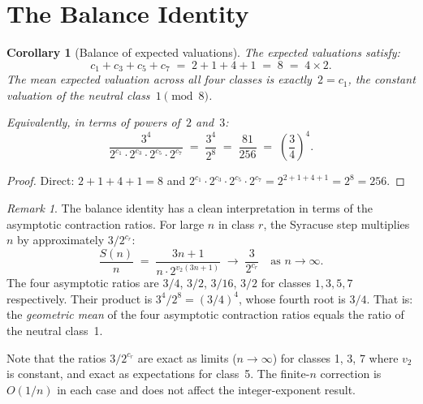 \documentclass[12pt]{article}
\newtheorem{corollary}[theorem]{Corollary}
\theoremstyle{definition}
\theoremstyle{remark}
\newtheorem{remark}[theorem]{Remark}
\newcommand{\vt}{v_2}
\newcommand{\Sm}{S}
\begin{document}
\section{The Balance Identity}
\label{sec:balance}

\begin{corollary}[Balance of expected valuations]
\label{cor:balance}
The expected valuations satisfy:
\[
  c_1 + c_3 + c_5 + c_7 \;=\; 2 + 1 + 4 + 1 \;=\; 8 \;=\; 4 \times 2.
\]
The mean expected valuation across all four classes is exactly~$2 = c_1$,
the constant valuation of the neutral class~$1 \pmod{8}$.

Equivalently, in terms of powers of~$2$ and~$3$:
\[
  \frac{3^4}{2^{c_1} \cdot 2^{c_3} \cdot 2^{c_5} \cdot 2^{c_7}}
  \;=\; \frac{3^4}{2^8}
  \;=\; \frac{81}{256}
  \;=\; \left(\frac{3}{4}\right)^4.
\]
\end{corollary}

\begin{proof}
Direct: $2 + 1 + 4 + 1 = 8$ and $2^{c_1}\cdot 2^{c_3}\cdot 2^{c_5}\cdot 2^{c_7}
= 2^{2+1+4+1} = 2^8 = 256$.
\end{proof}

\begin{remark}
The balance identity has a clean interpretation in terms of the asymptotic
contraction ratios. For large $n$ in class $r$, the Syracuse step multiplies $n$
by approximately $3/2^{c_r}$:
\[
  \frac{\Sm(n)}{n} \;=\; \frac{3n+1}{n \cdot 2^{\vt(3n+1)}}
  \;\longrightarrow\; \frac{3}{2^{c_r}} \quad \text{as } n \to \infty.
\]
The four asymptotic ratios are $3/4$, $3/2$, $3/16$, $3/2$ for classes
$1, 3, 5, 7$ respectively. Their product is $3^4/2^8 = (3/4)^4$, whose fourth
root is $3/4$. That is: the \emph{geometric mean} of the four asymptotic
contraction ratios equals the ratio of the neutral class~1.

Note that the ratios $3/2^{c_r}$ are exact as limits ($n \to \infty$) for
classes 1, 3, 7 where $\vt$ is constant, and exact as expectations for class~5.
The finite-$n$ correction is $O(1/n)$ in each case and does not affect the
integer-exponent result.
\end{remark}
\end{document}
